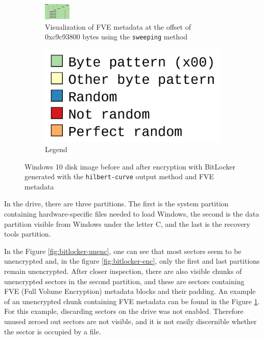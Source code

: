 \documentclass[
  digital, %
  color,   %
  oneside, %
  lof,     %
  nolot,     %
]{fithesis4}
\begin{document}
\begin{figure}
\begin{subfigure}[t]{0.45\textwidth}
    \includegraphics[width=\textwidth,interpolate=false]{fve4.png}
    \caption{Visualization of FVE metadata at the offset of 0xc9c93800 bytes using the \texttt{sweeping} method}
    \label{fig:bitlocker-metadata}
  \end{subfigure}
  \hfill
  \begin{subfigure}[t]{0.45\textwidth}
    \centering
    \includegraphics[width=\textwidth]{legend.png}
    \caption{Legend}
    \label{fig:bitlocker-legend}
  \end{subfigure}
  \caption{Windows 10 disk image before and after encryption with BitLocker generated with the \texttt{hilbert-curve} output method and FVE metadata}
  \label{fig:bitlocker}
\end{figure}
In the drive, there are three partitions.
The first is the system partition containing hardware-specific files needed to load Windows,\cite{winpart} the second is the data partition visible from Windows under the letter C, and the last is the recovery tools partition.\cite{winbiospart}

In the Figure \ref{fig:bitlocker-unenc}, one can see that most sectors seem to be unencrypted and, in the figure \ref{fig:bitlocker-enc}, only the first and last partitions remain unencrypted.
After closer inspection, there are also visible chunks of unencrypted sectors in the second partition, and these are sectors containing FVE (Full Volume Encryption) metadata blocks and their padding.\cite{metz22}
An example of an unencrypted chunk containing FVE metadata can be found in the Figure \ref{fig:bitlocker-metadata}. 
For this example, discarding sectors on the drive was not enabled. 
Therefore unused zeroed out sectors are not visible, and it is not easily discernible whether the sector is occupied by a file.
\end{document}
